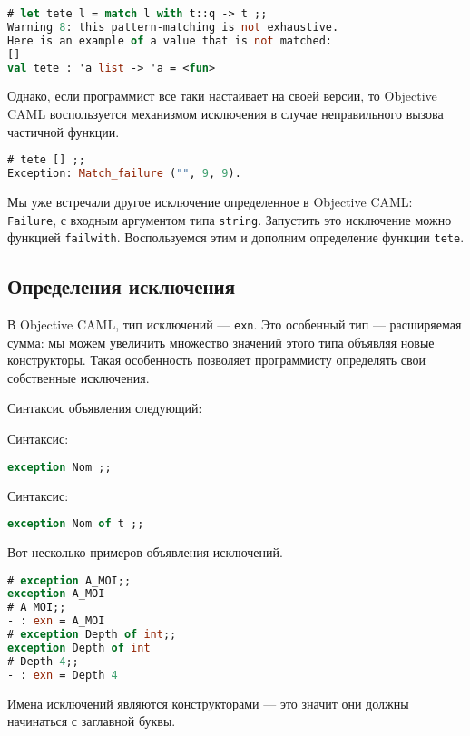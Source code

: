 \begin{lstlisting}[language=OCaml]
# let tete l = match l with t::q -> t ;;
Warning 8: this pattern-matching is not exhaustive.
Here is an example of a value that is not matched:
[]
val tete : 'a list -> 'a = <fun>
\end{lstlisting}

Однако, если программист все таки настаивает на своей версии, то Objective CAML
воспользуется механизмом исключения в случае неправильного вызова частичной
функции.

\begin{lstlisting}[language=OCaml]
# tete [] ;;
Exception: Match_failure ("", 9, 9).
\end{lstlisting}

Мы уже встречали другое исключение определенное в Objective CAML:
\texttt{Failure}, с входным аргументом типа \texttt{string}. Запустить это
исключение можно функцией \texttt{failwith}. Воспользуемся этим и дополним
определение функции \texttt{tete}.

\subsection{Определения исключения}

В Objective CAML, тип исключений --- \texttt{exn}. Это особенный тип ---
расширяемая сумма: мы можем увеличить множество значений этого типа объявляя
новые конструкторы. Такая особенность позволяет программисту определять свои
собственные исключения.

Синтаксис объявления следующий:

Синтаксис:

\begin{lstlisting}[language=OCaml]
exception Nom ;;
\end{lstlisting}

Синтаксис:

\begin{lstlisting}[language=OCaml]
exception Nom of t ;;
\end{lstlisting}

Вот несколько примеров объявления исключений.

\begin{lstlisting}[language=OCaml]
# exception A_MOI;;
exception A_MOI
# A_MOI;;
- : exn = A_MOI
# exception Depth of int;;
exception Depth of int
# Depth 4;;
- : exn = Depth 4
\end{lstlisting}

Имена исключений являются конструкторами --- это значит они должны начинаться с
заглавной буквы.

